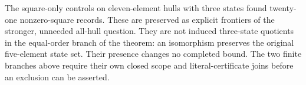\begin{remark}
The square-only controls on eleven-element hulls with three states
found twenty-one nonzero-square records.  These are preserved as
explicit frontiers of the stronger, unneeded all-hull question.
They are not induced three-state quotients in the equal-order
branch of the theorem: an isomorphism preserves the original
five-element state set.  Their presence changes no completed bound.
The two finite branches above require their own closed scope and
literal-certificate joins before an exclusion can be asserted.
\end{remark}
